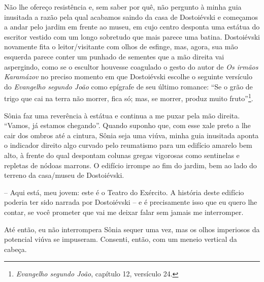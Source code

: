 Não lhe ofereço resistência e, sem saber por quê, não pergunto à minha
guia inusitada a razão pela qual acabamos saindo da casa de Dostoiévski
e começamos a andar pelo jardim em frente ao museu, em cujo centro
desponta uma estátua do escritor vestido com um longo sobretudo que mais
parece uma batina. Dostoiévski novamente fita o leitor/visitante com
olhos de esfinge, mas, agora, sua mão esquerda parece conter um punhado
de sementes que a mão direita vai aspergindo, como se o escultor
houvesse coagulado o gesto do autor de \emph{Os irmãos Karamázov} no
preciso momento em que Dostoiévski escolhe o seguinte versículo do
\emph{Evangelho segundo João} como epígrafe de seu último romance: ``Se
o grão de trigo que cai na terra não morrer, fica só; mas, se morrer,
produz muito fruto''\footnote{\emph{Evangelho segundo João}, capítulo
  12, versículo 24.}.

Sônia faz uma reverência à estátua e continua a me puxar pela mão
direita. ``Vamos, já estamos chegando''. Quando suponho que, com esse
xale preto a lhe cair dos ombros até a cintura, Sônia seja uma viúva,
minha guia inusitada aponta o indicador direito algo curvado pelo
reumatismo para um edifício amarelo bem alto, à frente do qual despontam
colunas gregas vigorosas como sentinelas e repletas de nódoas marrons. O
edifício irrompe ao fim do jardim, bem ao lado do terreno da casa/museu
de Dostoiévski.

-- Aqui está, meu jovem: este é o Teatro do Exército. A história deste
edifício poderia ter sido narrada por Dostoiévski -- e é precisamente
isso que eu quero lhe contar, se você prometer que vai me deixar falar
sem jamais me interromper.

Até então, eu não interrompera Sônia sequer uma vez, mas os olhos
imperiosos da potencial viúva se impuseram. Consenti, então, com um
meneio vertical da cabeça.

